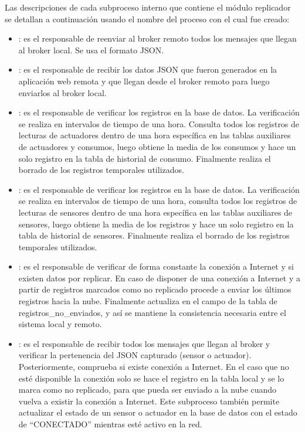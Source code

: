 Las descripciones de cada subproceso interno que contiene el módulo replicador se detallan a continuación usando el nombre del proceso con el cual fue creado: 

\begin{itemize}
\item {}: es el responsable de reenviar al broker remoto todos los mensajes que llegan al broker local. Se usa el formato JSON.

\item {}: es el responsable de recibir los datos JSON que fueron generados en la aplicación web remota y que llegan desde el broker remoto para luego enviarlos al broker local.

\item {}: es el responsable de verificar los registros en la base de datos. La verificación se realiza en intervalos de tiempo de una hora. Consulta todos los registros de lecturas de actuadores dentro de una hora específica en las tablas auxiliares de actuadores y consumos, luego obtiene la media de los consumos y hace un solo registro en la tabla de historial de consumo. Finalmente realiza el borrado de los registros temporales utilizados.

\item {}: es el responsable de verificar los registros en la base de datos. La verificación se realiza en intervalos de tiempo de una hora, consulta todos los registros de lecturas de sensores dentro de una hora específica en las tablas auxiliares de sensores, luego obtiene la media de los registros y hace un solo registro en la tabla de historial de sensores. Finalmente realiza el borrado de los registros temporales utilizados.

\item {}: es el responsable de verificar de forma constante la conexión a Internet y si existen datos por replicar. En caso de disponer de una conexión a Internet y a partir de registros marcados como no replicado procede a enviar los últimos registros hacia la nube. Finalmente actualiza en el campo de la tabla de registros\_no\_enviados, y así se mantiene la consistencia necesaria entre el sistema local y remoto.

\item {}: es el responsable de recibir todos los mensajes que llegan al broker y verificar la pertenencia del JSON capturado (sensor o actuador). Posteriormente, comprueba si existe conexión a Internet. En el caso que no esté disponible la conexión solo se hace el registro en la tabla local y se lo marca como no replicado, para que pueda ser enviado a la nube cuando vuelva a existir la conexión a Internet. Este subproceso también permite actualizar el estado de un sensor o actuador en la base de datos con el estado de ``CONECTADO'' mientras esté activo en la red.


\end{itemize}
